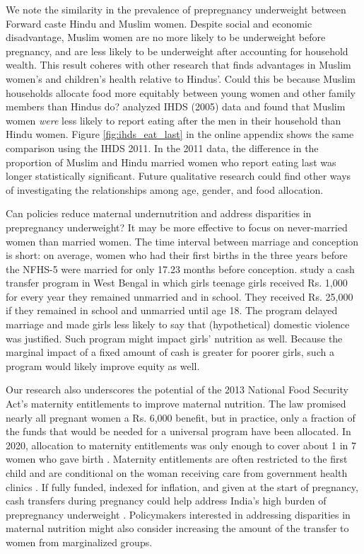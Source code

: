 \documentclass[12pt]{article}
\begin{document}
We note the similarity in the prevalence of prepregnancy underweight between Forward caste Hindu and Muslim women.  Despite social and economic disadvantage, Muslim women are no more likely to be underweight before pregnancy, and are less likely to be underweight after accounting for household wealth.  This result coheres with other research that finds advantages in Muslim women's and children's health relative to Hindus'. Could this be because Muslim households allocate food more equitably between young women and other family members than Hindus do?  \cite{desai2014muslim} analyzed IHDS (2005) data and found that Muslim women \emph{were} less likely to report eating after the men in their household than Hindu women.  Figure \ref{fig:ihds_eat_last} in the online appendix shows the same comparison using the IHDS 2011.  In the 2011 data, the difference in the proportion of Muslim and Hindu married women who report eating last was longer statistically significant.  Future qualitative research could find other ways of investigating the relationships among age, gender, and food allocation.

Can policies reduce maternal undernutrition and address disparities in prepregnancy underweight?  It may be more effective to focus on never-married women than married women.  The time interval between marriage and conception is short: on average, women who had their first births in the three years before the NFHS-5 were married for only 17.23 months before conception.  \cite{banerjee2024persistent} study a cash transfer program in West Bengal in which girls teenage girls received Rs. 1,000 for every year they remained unmarried and in school. They received Rs. 25,000 if they remained in school and unmarried until age 18.  The program delayed marriage and made girls less likely to say that (hypothetical) domestic violence was justified.  Such program might impact girls' nutrition as well.  Because the marginal impact of a fixed amount of cash is greater for poorer girls, such a program would likely improve equity as well.  

Our research also underscores the potential of the 2013 National Food Security Act's maternity entitlements to improve maternal nutrition.  The law promised nearly all pregnant women a Rs. 6,000 benefit, but in practice, only a fraction of the funds that would be needed for a universal program have been allocated.  In 2020, allocation to maternity entitlements was only enough to cover about 1 in 7 women who gave birth \cite{dreze2021derailed}.  Maternity entitlements are often restricted to the first child and are conditional on the woman receiving care from government health clinics \citep{kalra2020birth}.  If fully funded, indexed for inflation, and given at the start of pregnancy, cash transfers during pregnancy could help address India's high burden of prepregnancy underweight \citep{coffey2016underweight}. Policymakers interested in addressing disparities in maternal nutrition might also consider increasing the amount of the transfer to women from marginalized groups.
\end{document}
